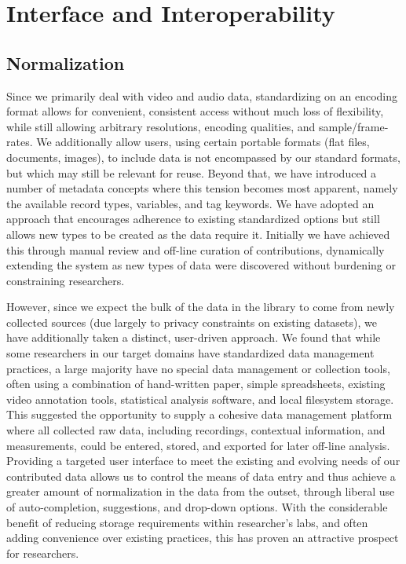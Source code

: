 \documentclass{sig-alternate}
\begin{document}
\section{Interface and Interoperability}

\subsection{Normalization}

Since we primarily deal with video and audio data, standardizing on an encoding format allows for convenient, consistent access without much loss of flexibility, while still allowing arbitrary resolutions, encoding qualities, and sample\-/frame-rates.
We additionally allow users, using certain portable formats (flat files, documents, images), to include data is not encompassed by our standard formats, but which may still be relevant for reuse.
Beyond that, we have introduced a number of metadata concepts where this tension becomes most apparent, namely the available record types, variables, and tag keywords.
We have adopted an approach that encourages adherence to existing standardized options but still allows new types to be created as the data require it.
Initially we have achieved this through manual review and off-line curation of contributions, dynamically extending the system as new types of data were discovered without burdening or constraining researchers.

However, since we expect the bulk of the data in the library to come from newly collected sources (due largely to privacy constraints on existing datasets), we have additionally taken a distinct, user-driven approach.
We found that while some researchers in our target domains have standardized data management practices, a large majority have no special data management or collection tools, often using a combination of hand-written paper, simple spreadsheets, existing video annotation tools, statistical analysis software, and local filesystem storage.
This suggested the opportunity to supply a cohesive data management platform where all collected raw data, including recordings, contextual information, and measurements, could be entered, stored, and exported for later off-line analysis.
Providing a targeted user interface to meet the existing and evolving needs of our contributed data allows us to control the means of data entry and thus achieve a greater amount of normalization in the data from the outset, through liberal use of auto-completion, suggestions, and drop-down options.
With the considerable benefit of reducing storage requirements within researcher's labs, and often adding convenience over existing practices, this has proven an attractive prospect for researchers.
\end{document}
